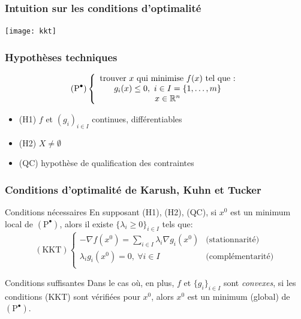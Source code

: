 \documentclass{beamer}
\newcommand{\R}{{\ensuremath\mathbb{R}}}
\begin{document}
\begin{frame}
  \frametitle{Intuition sur les conditions d'optimalité}

  \begin{center}
      \texttt{[image: kkt]}    
  \end{center}

\end{frame}

\begin{frame}
  \frametitle{Hypothèses techniques}

  \[
  (\text{P}^\bullet) \left\{
  \begin{array}{c}
    \text{trouver} \ x \ \text{qui minimise} \ f(x) \ \text{tel que :} \\
    g_i(x) \leq 0, \ i \in I = \{1, \dots, m\} \\
    x \in \R^n
  \end{array}
  \right.
  \]

  \begin{itemize}
  \item (H1) $f$ et $(g_i)_{i \in I}$ continues, différentiables
  \item (H2) $X \neq \emptyset$
  \item (QC) hypothèse de qualification des contraintes
  \end{itemize}
  
\end{frame}

\begin{frame}
  \frametitle{Conditions d'optimalité de Karush, Kuhn et Tucker}

  \begin{block}{Conditions nécessaires}
    En supposant (H1), (H2), (QC), si $x^0$ est un minimum local de $(\text{P}^\bullet)$,
    alors il existe $\{\lambda_i \geq 0\}_{i \in I}$ tels que:
    \[
    (\text{KKT})
    \left\{
    \begin{array}{ll}
      -{\nabla f}(x^0) = \sum_{i \in I} \lambda_i {\nabla g_i}(x^0)
      & \text{(stationnarité)} \\
      \lambda_i g_i(x^0) = 0, \ \forall i \in I
      & \text{(complémentarité)} \\
    \end{array}
    \right.
    \]
  \end{block}

  \begin{block}{Conditions suffisantes}
    Dans le cas où, en plus, $f$ et $\{g_i\}_{i\in I}$ sont \emph{convexes},
    si les conditions (KKT) sont vérifiées pour $x^0$, alors $x^0$ est un minimum
    (global) de $(\text{P}^\bullet)$.  
  \end{block}
  
\end{frame}
\end{document}
